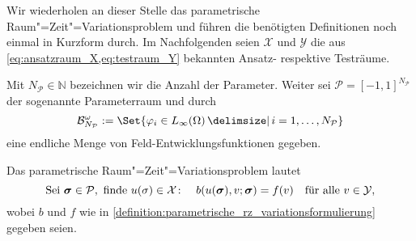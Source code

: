 \documentclass[../main.tex]{subfiles}
\begin{document}
Wir wiederholen an dieser Stelle das parametrische Raum"=Zeit"=Variationsproblem und führen die benötigten Definitionen noch einmal in Kurzform durch.
Im Nachfolgenden seien $\mathcal X$ und $\mathcal Y$ die aus \cref{eq:ansatzraum_X,eq:testraum_Y} bekannten Ansatz- respektive Testräume.

\begin{Bemerkung}
    Mit $N_{\mathcal P} \in \mathbb{N}$ bezeichnen wir die Anzahl der Parameter.
    Weiter sei $\mathcal P = [-1, 1]^{N_{\mathcal P}}$ der sogenannte Parameterraum und durch
    \begin{equation}
        \mathcal B^{\omega}_{N_{\mathcal P}} := \Set{ \varphi_{i} \in L_{\infty}(\Omega) \given i = 1, \dots, N_{\mathcal P}}
    \end{equation}
    eine endliche Menge von Feld-Entwicklungsfunktionen gegeben.
\end{Bemerkung}

\begin{Bemerkung}
    Das parametrische Raum"=Zeit"=Variationsproblem lautet
    \begin{equation}
    \label{eq:wiederholung_variationsproblem}
        \text{Sei }\bm \sigma \in \mathcal P, \text{ finde } u(\sigma) \in \mathcal X \colon \quad b(u(\bm \sigma), v; \bm \sigma) = f(v) \quad \fa v \in \mathcal Y,
    \end{equation}
    wobei $b$ und $f$ wie in \cref{definition:parametrische_rz_variationsformulierung} gegeben seien.
\end{Bemerkung}
\end{document}
